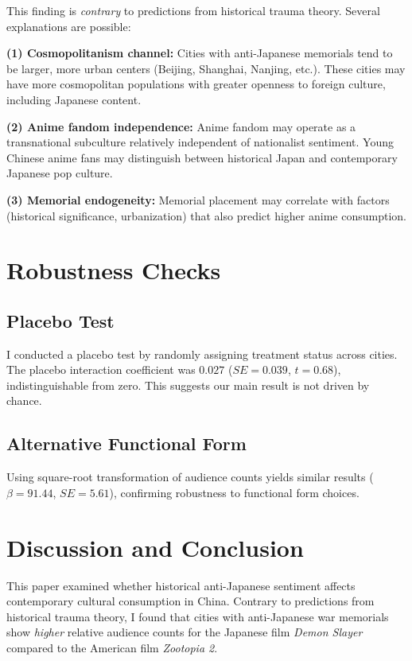\documentclass[12pt]{article}
\begin{document}
This finding is \textit{contrary} to predictions from historical trauma theory. Several explanations are possible:

\textbf{(1) Cosmopolitanism channel:} Cities with anti-Japanese memorials tend to be larger, more urban centers (Beijing, Shanghai, Nanjing, etc.). These cities may have more cosmopolitan populations with greater openness to foreign culture, including Japanese content.

\textbf{(2) Anime fandom independence:} Anime fandom may operate as a transnational subculture relatively independent of nationalist sentiment. Young Chinese anime fans may distinguish between historical Japan and contemporary Japanese pop culture.

\textbf{(3) Memorial endogeneity:} Memorial placement may correlate with factors (historical significance, urbanization) that also predict higher anime consumption.

\section{Robustness Checks}

\subsection{Placebo Test}

I conducted a placebo test by randomly assigning treatment status across cities. The placebo interaction coefficient was $0.027$ ($SE = 0.039$, $t = 0.68$), indistinguishable from zero. This suggests our main result is not driven by chance.

\subsection{Alternative Functional Form}

Using square-root transformation of audience counts yields similar results ($\beta = 91.44$, $SE = 5.61$), confirming robustness to functional form choices.

\section{Discussion and Conclusion}

This paper examined whether historical anti-Japanese sentiment affects contemporary cultural consumption in China. Contrary to predictions from historical trauma theory, I found that cities with anti-Japanese war memorials show \textit{higher} relative audience counts for the Japanese film \textit{Demon Slayer} compared to the American film \textit{Zootopia 2}.
\end{document}
